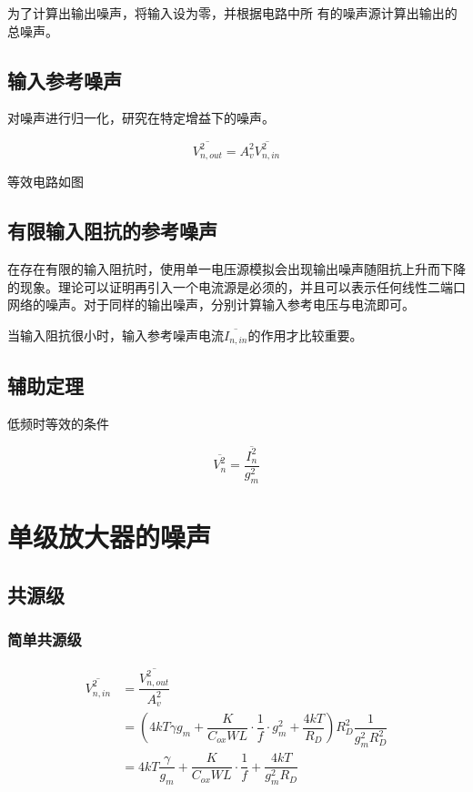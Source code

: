 \documentclass[cn,11pt,chinese,black,simple]{../elegantbook}
\begin{document}
为了计算出输出噪声，将输入设为零，并根据电路中所
有的噪声源计算出输出的总噪声。

\subsection{输入参考噪声}

对噪声进行归一化，研究在特定增益下的噪声。

\[\overline{V_{n,out}^2} = A_v^2 \overline{V_{n,in}^2}\]

等效电路如图


\subsection{有限输入阻抗的参考噪声}

在存在有限的输入阻抗时，使用单一电压源模拟会出现输出噪声随阻抗上升而下降的现象。理论可以证明再引入一个电流源是必须的，并且可以表示任何线性二端口网络的噪声。对于同样的输出噪声，分别计算输入参考电压与电流即可。

当输入阻抗很小时，输入参考噪声电流\(\overline{I_{n,in}}\)的作用才比较重要。


\subsection{辅助定理}

低频时等效的条件

\[\overline{V_n^2} = \dfrac{\overline{I_n^2}}{g_m^2}\]


\section{单级放大器的噪声}

\subsection{共源级}


\subsubsection{简单共源级}





\[\begin{aligned}
    \overline{V_{n, i n}^{2}} &=\dfrac{\overline{V_{n, o u t}^{2}}}{A_{v}^{2}} \\
    &=\left(4 k T \gamma g_{m}+\dfrac{K}{C_{o x} W L} \cdot \dfrac{1}{f} \cdot g_{m}^{2}+\dfrac{4 k T}{R_{D}}\right) R_{D}^{2} \dfrac{1}{g_{m}^{2} R_{D}^{2}} \\
    &=4 k T \dfrac{\gamma}{g_{m}}+\dfrac{K}{C_{o x} W L} \cdot \dfrac{1}{f}+\dfrac{4 k T}{g_{m}^{2} R_{D}}
\end{aligned}\]
\end{document}
